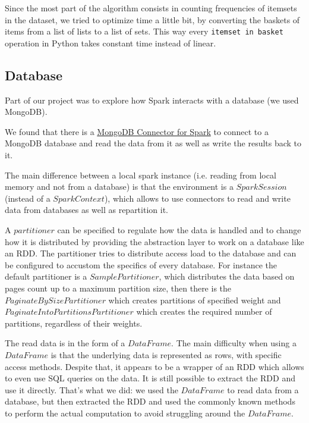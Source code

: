 \documentclass[a4paper]{article}
\begin{document}
	Since the most part of the algorithm consists in counting frequencies of itemsets in the dataset, we tried to optimize time a little bit, by converting the baskets of items from a list of lists to
	a list of sets. This way every \texttt{itemset in basket} operation in Python takes constant time instead of linear.\\

	\subsection{Database}
	\label{section:database}
	Part of our project was to explore how Spark interacts with a database (we used MongoDB).
	
	We found that there is a \href{https://www.mongodb.com/docs/spark-connector/current/}{MongoDB Connector for Spark} to connect to a MongoDB database and read the data from it as well as write the results back to it.
	
	The main difference between a local spark instance (i.e. reading from local memory and not from a database) is that the environment is a $SparkSession$ (instead of a $SparkContext$), which allows to use connectors 
	to read and write data from databases as well as repartition it.

	A $partitioner$ can be specified to regulate how the data is handled and to change how it is distributed by providing the abstraction layer to work on a database like an RDD. 
	The partitioner tries to distribute access load to the database and can be configured to accustom the specifics of every database. For instance the default partitioner is a $SamplePartitioner$, which
	distributes the data based on pages count up to a maximum partition size, then there is the $PaginateBySizePartitioner$ which creates partitions of specified weight and $PaginateIntoPartitionsPartitioner$
	which creates the required number of partitions, regardless of their weights.

	The read data is in the form of a $DataFrame$. The main difficulty when using a $DataFrame$ is that the underlying data is represented as rows, with specific access methods. Despite that, it appears 
	to be a wrapper of an RDD which allows to even use SQL queries on the data. It is still possible to extract the RDD and use it directly. That's what we did: we used the $DataFrame$ to read data from a database, but then extracted the RDD and used the commonly known methods to perform the actual computation to avoid struggling around
	the $DataFrame$.
\end{document}
